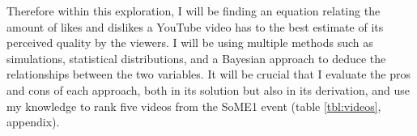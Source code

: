 \documentclass[a4paper,11pt]{article}
\begin{document}

Therefore within this exploration, I will be finding an equation relating the amount of likes and dislikes a YouTube video has to the best estimate of its perceived quality by the viewers. I will be using multiple methods such as simulations, statistical distributions, and a Bayesian approach to deduce the relationships between the two variables. It will be crucial that I evaluate the pros and cons of each approach, both in its solution but also in its derivation, and use my knowledge to rank five videos from the SoME1 event (table \ref{tbl:videos}, appendix).





\end{document}
